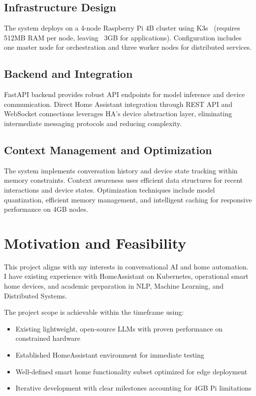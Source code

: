 \documentclass[12pt]{article}
\begin{document}
\subsection{Infrastructure Design}
The system deploys on a 4-node Raspberry Pi 4B cluster using K3s~\cite{k3s2019} (requires 512MB RAM per node, leaving ~3GB for applications). Configuration includes one master node for orchestration and three worker nodes for distributed services.

\subsection{Backend and Integration}
FastAPI backend provides robust API endpoints for model inference and device communication. Direct Home Assistant integration through REST API and WebSocket connections leverages HA's device abstraction layer, eliminating intermediate messaging protocols and reducing complexity.

\subsection{Context Management and Optimization}
The system implements conversation history and device state tracking within memory constraints. Context awareness uses efficient data structures for recent interactions and device states. Optimization techniques include model quantization, efficient memory management, and intelligent caching for responsive performance on 4GB nodes.

\section{Motivation and Feasibility}

This project aligns with my interests in conversational AI and home automation. I have existing experience with HomeAssistant on Kubernetes, operational smart home devices, and academic preparation in NLP, Machine Learning, and Distributed Systems.

The project scope is achievable within the timeframe using:
\begin{itemize}
\item Existing lightweight, open-source LLMs with proven performance on constrained hardware
\item Established HomeAssistant environment for immediate testing
\item Well-defined smart home functionality subset optimized for edge deployment
\item Iterative development with clear milestones accounting for 4GB Pi limitations
\end{itemize}
\end{document}
